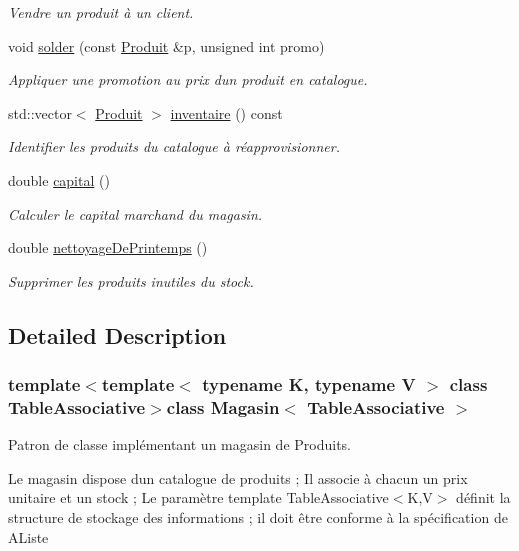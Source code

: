 \begin{DoxyCompactItemize}
\begin{DoxyCompactList}\small\item\em Vendre un produit à un client. \end{DoxyCompactList}\item 
void \hyperlink{class_magasin_a25b9dff01611d98ff73818550e90d975}{solder} (const \hyperlink{class_produit}{Produit} \&p, unsigned int promo)
\begin{DoxyCompactList}\small\item\em Appliquer une promotion au prix d\textquotesingle{}un produit en catalogue. \end{DoxyCompactList}\item 
std\+::vector$<$ \hyperlink{class_produit}{Produit} $>$ \hyperlink{class_magasin_a5c584ead4ae820ba3dacd401dc58b185}{inventaire} () const 
\begin{DoxyCompactList}\small\item\em Identifier les produits du catalogue à réapprovisionner. \end{DoxyCompactList}\item 
double \hyperlink{class_magasin_a01027ad25aaa0b76fdb0296ac8152fea}{capital} ()
\begin{DoxyCompactList}\small\item\em Calculer le capital marchand du magasin. \end{DoxyCompactList}\item 
double \hyperlink{class_magasin_adbf47feaf2339f8502e890ba795e368a}{nettoyage\+De\+Printemps} ()
\begin{DoxyCompactList}\small\item\em Supprimer les produits inutiles du stock. \end{DoxyCompactList}\end{DoxyCompactItemize}


\subsection{Detailed Description}
\subsubsection*{template$<$template$<$ typename K, typename V $>$ class Table\+Associative$>$class Magasin$<$ Table\+Associative $>$}

Patron de classe implémentant un magasin de Produits. 

Le magasin dispose d\textquotesingle{}un catalogue de produits ; Il associe à chacun un prix unitaire et un stock ; Le paramètre template Table\+Associative$<$\+K,\+V$>$ définit la structure de stockage des informations ; il doit être conforme à la spécification de A\+Liste 

